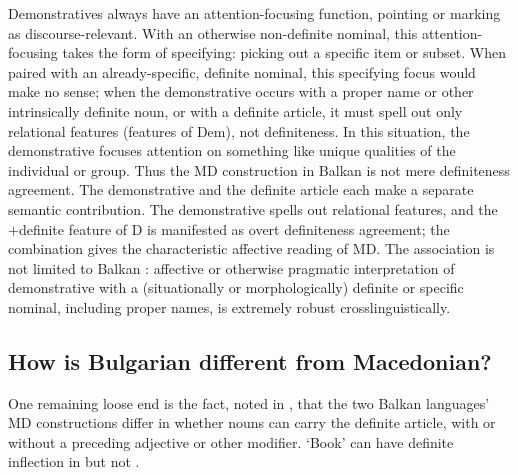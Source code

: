 \documentclass[output=paper]{langscibook}
\begin{document}
\noindent Demonstratives always have an attention-focusing function, pointing or marking as discourse-relevant. With an otherwise non-definite nominal, this attention-focusing takes the form of specifying: picking out a specific item or subset. When paired with an already-specific, definite nominal, this specifying focus would make no sense; when the demonstrative occurs with a proper name or other intrinsically definite noun, or with a definite article, it must spell out only relational features (features of Dem), not definiteness. In this situation, the demonstrative focuses attention on something like unique qualities of the individual or group. Thus the MD construction in Balkan  is not mere definiteness agreement. The demonstrative and the definite article each make a separate semantic contribution. The demonstrative spells out relational features, and the $+$definite feature of D is manifested as overt definiteness agreement; the combination gives the characteristic affective reading of MD. The association is not limited to Balkan : affective or otherwise pragmatic interpretation of demonstrative with a (situationally or morphologically) definite or specific nominal, including proper names, is extremely robust crosslinguistically.

\subsection{How is Bulgarian different from Macedonian?}
One remaining loose end is the fact, noted in , that the two Balkan  languages' MD constructions differ in whether nouns can carry the definite article, with or without a preceding adjective or other modifier. ‘Book’ can have definite inflection in   but not  .
\end{document}
